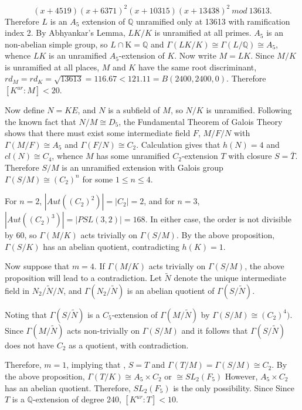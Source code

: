 \documentclass[12pt]{extarticle}
\newcommand{\Q}{\mathbb{Q}}
\newcommand{\<}{\langle}
\renewcommand{\>}{\rangle}
\theoremstyle{definition}
\begin{document}
\begin{equation}
(x+4519)(x+6371)^2(x+10315)(x+13438)^2 \: mod \: 13613.
\end{equation}
Therefore $L$ is an $A_5$ extension of $\Q$ unramified only at 13613 with ramification index 2. By Abhyankar's Lemma, $LK/K$ is unramified at all primes. $A_5$ is an non-abelian simple group, so $L \cap $K$ = \Q$ and $\Gamma(LK/K) \cong \Gamma(L/\Q) \cong A_5$, whence $LK$ is an unramified $A_5$-extension of $K$.
Now write $M=LK$. Since $M/K$ is unramified at all places, $M$ and $K$ have the same root discriminant, $rd_M = rd_K = \sqrt{13613} = 116.67 < 121.11 = B(2400,2400,0)$. Therefore $[K^{ur}:M]<20$. \par
Now define $N=KE$, and $N$ is a subfield of $M$, so $N/K$ is unramified. Following the known fact that $N/M \cong D_5$, the Fundamental Theorem of Galois Theory shows that there must exist some intermediate field $F$, $M/F/N$ with $\Gamma(M/F) \cong A_5$ and $\Gamma(F/N) \cong C_2$. Calculation gives that $h(N)=4$ and $cl(N) \cong C_4$, whence $M$ has some unramified $C_2$-extension $T$ with closure $S = \bar{T}$. Therefore $S/M$ is an unramified extension with Galois group $\Gamma(S/M) \cong \left(C_2 \right)^{n}$ for some $1 \leq n \leq 4$. \par
For $n=2$, $|Aut((C_2)^2)| = |C_2| = 2$, and for $n=3$, $|Aut((C_2)^3)| = |PSL(3,2)| = 168$. In either case, the order is not divisible by 60, so $\Gamma(M/K)$ acts trivially on $\Gamma(S/M)$. By the above proposition, $\Gamma(S/K)$ has an abelian quotient, contradicting $h(K)=1$. \par
Now suppose that $m=4$. 
If $\Gamma(M/K)$ acts trivially on $\Gamma(S/M)$, the above proposition will lead to a contradiction. Let $\tilde{N}$ denote the unique intermediate field in $N_2/\tilde{N}/N$, and $\Gamma(N_2/\tilde{N})$ is an abelian quotient of $\Gamma(S/\tilde{N})$. \par 
Noting that  $\Gamma(S/\tilde{N})$ is a $C_5$-extension of
$\Gamma(M/\tilde{N})$ by $\Gamma(S/M) \cong (C_2)^{4})$. Since 
$\Gamma(M/\tilde{N})$ acts non-trivially on $\Gamma(S/M)$
 and it follows that  $\Gamma(S/\tilde{N})$ does not have $C_2$ as a quotient, with contradiction. \par
Therefore, $m = 1$, implying that , $S=T$ and $\Gamma(T/M) = \Gamma(S/M) \cong C_2$. By the above proposition, $\Gamma(T/K) \cong A_5 \times C_2$  or $\cong SL_2(F_5)$ However, $A_5 \times C_2$ has an abelian quotient. Therefore,  $SL_2(F_5)$ is the only possibility. Since Since $T$ is a $\Q$-extension of degree 240, $[K^{ur}:T] < 10$. 
\end{document}
